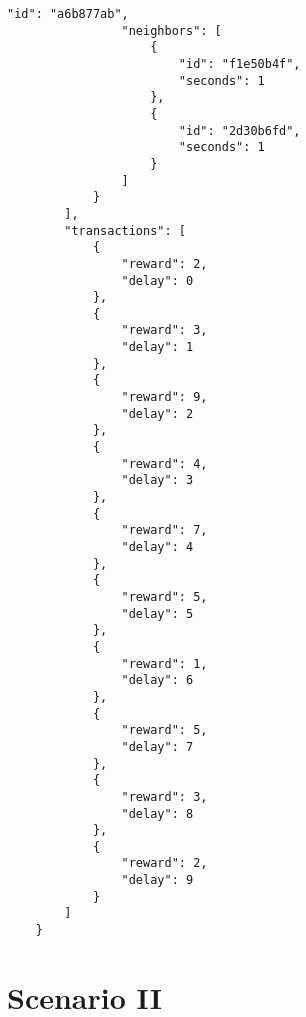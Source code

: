 \begin{lstlisting}[caption={Scenario 1}, label={lst:scenario 1}]
                "id": "a6b877ab",
                "neighbors": [
                    {
                        "id": "f1e50b4f",
                        "seconds": 1
                    },
                    {
                        "id": "2d30b6fd",
                        "seconds": 1
                    }
                ]
            }
        ],
        "transactions": [
            {
                "reward": 2,
                "delay": 0
            },
            {
                "reward": 3,
                "delay": 1
            },
            {
                "reward": 9,
                "delay": 2
            },
            {
                "reward": 4,
                "delay": 3
            },
            {
                "reward": 7,
                "delay": 4
            },
            {
                "reward": 5,
                "delay": 5
            },
            {
                "reward": 1,
                "delay": 6
            },
            {
                "reward": 5,
                "delay": 7
            },
            {
                "reward": 3,
                "delay": 8
            },
            {
                "reward": 2,
                "delay": 9
            }
        ]
    }
\end{lstlisting}

\section{Scenario II}

